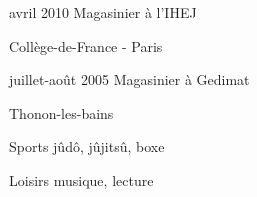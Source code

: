 \documentclass[10pt,a4paper]{scrartcl}
\begin{document}
\begin{cv}{}
\begin{cvlist}{}
  \end{cvlist}

  \begin{cvlist}{}\label{experiences}

  \item[avril 2010] Magasinier \`a l'IHEJ

    Coll\`ege-de-France - Paris

  \item[juillet-ao\^ut 2005] Magasinier \`a Gedimat

    Thonon-les-bains

  \end{cvlist}

  \begin{cvlist}{}\label{interets}

  \item[Sports] j\^ud\^o, j\^ujits\^u, boxe

  \item[Loisirs] musique, lecture

  \end{cvlist}

\end{cv}
\end{document}

